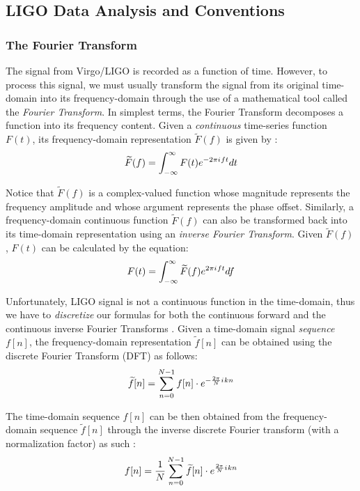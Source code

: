 \documentclass[preprint,
letterpaper,
 amsmath,amssymb,
 aps,
]{revtex4-2}
\newcommand{\iu}{{i\mkern1mu}}
\begin{document}
\subsection{LIGO Data Analysis and Conventions}
\subsubsection{The Fourier Transform}
The signal from Virgo/LIGO is recorded as a function of time. However, to process this signal, we must usually transform the signal from its original time-domain into its frequency-domain through the use of a mathematical tool called the \textit{Fourier Transform}. In simplest terms, the Fourier Transform decomposes a function into its frequency content. Given a \textit{continuous} time-series function $F(t)$, its frequency-domain representation $\widetilde{F}(f)$ is given by \cite{dsptextbook}:
\begin{equation}
\widetilde{F}(f) = \int_{-\infty}^{\infty}F(t)e^{-2\pi\iu ft} dt
\end{equation}

Notice that $\widetilde{F}(f)$ is a complex-valued function whose magnitude represents the frequency amplitude and whose argument represents the phase offset. Similarly, a frequency-domain continuous function $\widetilde{F}(f)$ can also be transformed back into its time-domain representation using an \textit{inverse Fourier Transform}. Given $\widetilde{F}(f)$, $F(t)$ can be calculated by the equation:
\begin{equation}
F(t) = \int_{-\infty}^{\infty}\widetilde{F}(f)e^{2\pi\iu ft} df
\end{equation}

Unfortunately, LIGO signal is not a continuous function in the time-domain, thus we have to \textit{discretize} our formulas for both the continuous forward and the continuous inverse Fourier Transforms \cite{dsptextbook}. Given a time-domain signal \textit{sequence} $f[n]$, the frequency-domain representation $\widetilde{f}[n]$ can be obtained using the discrete Fourier Transform (DFT) as follows\cite{roberts_2020}:
\begin{equation}
\widetilde{f}[n]=\sum _{n=0}^{N-1}f[n]\cdot e^{-{\frac {2\pi}{N}\iu kn}}
\end{equation}

The time-domain sequence $f[n]$ can be then obtained from the frequency-domain sequence $\widetilde{f}[n]$ through the inverse discrete Fourier transform (with a normalization factor) as such \cite{roberts_2020}:
\begin{equation}
f[n]=\frac{1}{N}\sum _{n=0}^{N-1}\widetilde{f}[n]\cdot e^{{\frac {2\pi}{N}\iu kn}}
\end{equation}
\end{document}
